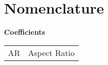 \documentclass[conf]{new-aiaa}
\begin{document}
\section*{Nomenclature}
\hspace{-0.5in}\textbf{Coefficients}
{\renewcommand\arraystretch{1.0}
\noindent\begin{longtable*}{@{}l @{\quad=\quad} l@{}}
    AR & Aspect Ratio \\

\end{longtable*}}
\end{document}
